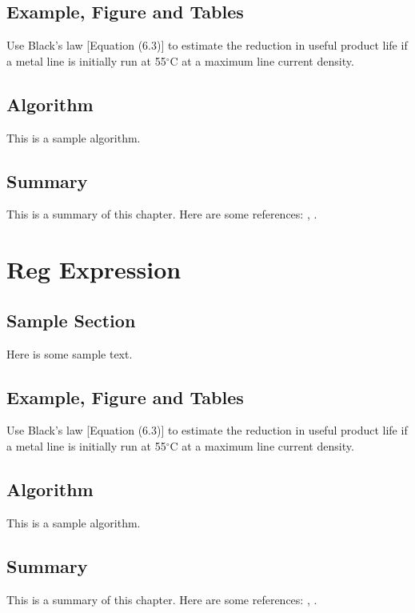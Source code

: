 \documentclass{wileySix}
\begin{document}
\section{Example, Figure and Tables}
\vskip6pt
\begin{example}
	Use Black's law [Equation (6.3)] to estimate the reduction in useful product
	life if a metal line is initially run at 55$^\circ$C at a maximum line
	current density.
\end{example}

\section{Algorithm}
This is a sample algorithm.

\section{Summary}
This is a summary of this chapter.
Here are some references: \cite{xkilby}, \cite{xberen}.

\chapter{Reg Expression}

\section{Sample Section}
Here is some sample text.

\section{Example, Figure and Tables}
\vskip6pt
\begin{example}
	Use Black's law [Equation (6.3)] to estimate the reduction in useful product
	life if a metal line is initially run at 55$^\circ$C at a maximum line
	current density.
\end{example}

\section{Algorithm}
This is a sample algorithm.

\section{Summary}
This is a summary of this chapter.
Here are some references: \cite{xkilby}, \cite{xberen}.
\end{document}

